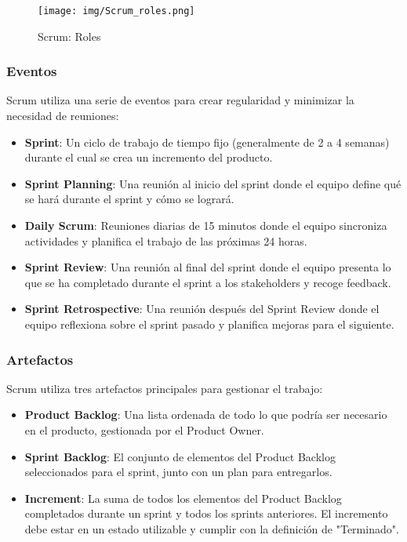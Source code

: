 \documentclass[a4paper, 12pt]{book}
\begin{document}
\begin{figure}[H]
  \centering
  \texttt{[image: img/Scrum\_roles.png]}
  \caption{Scrum: Roles}
  \label{fig:roles}
\end{figure}


\subsubsection{Eventos}
Scrum utiliza una serie de eventos para crear regularidad y minimizar la necesidad de reuniones:

\begin{itemize}
    \item \textbf{Sprint}: Un ciclo de trabajo de tiempo fijo (generalmente de 2 a 4 semanas) durante el cual se crea un incremento del producto.
    \item \textbf{Sprint Planning}: Una reunión al inicio del sprint donde el equipo define qué se hará durante el sprint y cómo se logrará.
    \item \textbf{Daily Scrum}: Reuniones diarias de 15 minutos donde el equipo sincroniza actividades y planifica el trabajo de las próximas 24 horas.
    \item \textbf{Sprint Review}: Una reunión al final del sprint donde el equipo presenta lo que se ha completado durante el sprint a los stakeholders y recoge feedback.
    \item \textbf{Sprint Retrospective}: Una reunión después del Sprint Review donde el equipo reflexiona sobre el sprint pasado y planifica mejoras para el siguiente.
\end{itemize}



\subsubsection{Artefactos}

Scrum utiliza tres artefactos principales para gestionar el trabajo:

\begin{itemize}
    \item \textbf{Product Backlog}: Una lista ordenada de todo lo que podría ser necesario en el producto, gestionada por el Product Owner.
    \item \textbf{Sprint Backlog}: El conjunto de elementos del Product Backlog seleccionados para el sprint, junto con un plan para entregarlos.
    \item \textbf{Increment}: La suma de todos los elementos del Product Backlog completados durante un sprint y todos los sprints anteriores. El incremento debe estar en un estado utilizable y cumplir con la definición de "Terminado".
\end{itemize}
\end{document}
